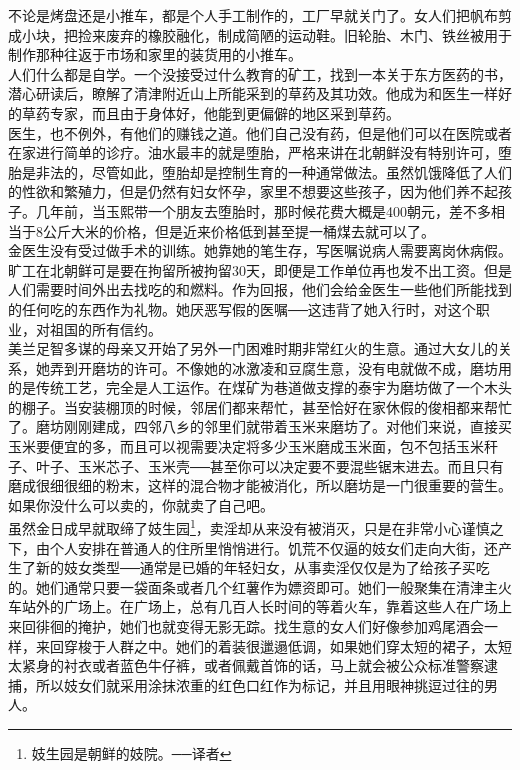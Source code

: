 不论是烤盘还是小推车，都是个人手工制作的，工厂早就关门了。女人们把帆布剪成小块，把捡来废弃的橡胶融化，制成简陋的运动鞋。旧轮胎、木门、铁丝被用于制作那种往返于市场和家里的装货用的小推车。\\

人们什么都是自学。一个没接受过什么教育的矿工，找到一本关于东方医药的书，潜心研读后，瞭解了清津附近山上所能采到的草药及其功效。他成为和医生一样好的草药专家，而且由于身体好，他能到更偏僻的地区采到草药。\\

医生，也不例外，有他们的赚钱之道。他们自己没有药，但是他们可以在医院或者在家进行简单的诊疗。油水最丰的就是堕胎，严格来讲在北朝鲜没有特别许可，堕胎是非法的，尽管如此，堕胎却是控制生育的一种通常做法。虽然饥饿降低了人们的性欲和繁殖力，但是仍然有妇女怀孕，家里不想要这些孩子，因为他们养不起孩子。几年前，当玉熙带一个朋友去堕胎时，那时候花费大概是400朝元，差不多相当于8公斤大米的价格，但是近来价格低到甚至提一桶煤去就可以了。\\

金医生没有受过做手术的训练。她靠她的笔生存，写医嘱说病人需要离岗休病假。旷工在北朝鲜可是要在拘留所被拘留30天，即便是工作单位再也发不出工资。但是人们需要时间外出去找吃的和燃料。作为回报，他们会给金医生一些他们所能找到的任何吃的东西作为礼物。她厌恶写假的医嘱──这违背了她入行时，对这个职业，对祖国的所有信约。\\

美兰足智多谋的母亲又开始了另外一门困难时期非常红火的生意。通过大女儿的关系，她弄到开磨坊的许可。不像她的冰激凌和豆腐生意，没有电就做不成，磨坊用的是传统工艺，完全是人工运作。在煤矿为巷道做支撑的泰宇为磨坊做了一个木头的棚子。当安装棚顶的时候，邻居们都来帮忙，甚至恰好在家休假的俊相都来帮忙了。磨坊刚刚建成，四邻八乡的邻里们就带着玉米来磨坊了。对他们来说，直接买玉米要便宜的多，而且可以视需要决定将多少玉米磨成玉米面，包不包括玉米秆子、叶子、玉米芯子、玉米壳──甚至你可以决定要不要混些锯末进去。而且只有磨成很细很细的粉末，这样的混合物才能被消化，所以磨坊是一门很重要的营生。\\

如果你没什么可以卖的，你就卖了自己吧。\\

虽然金日成早就取缔了妓生园\footnote{妓生园是朝鲜的妓院。──译者}，卖淫却从来没有被消灭，只是在非常小心谨慎之下，由个人安排在普通人的住所里悄悄进行。饥荒不仅逼的妓女们走向大街，还产生了新的妓女类型──通常是已婚的年轻妇女，从事卖淫仅仅是为了给孩子买吃的。她们通常只要一袋面条或者几个红薯作为嫖资即可。她们一般聚集在清津主火车站外的广场上。在广场上，总有几百人长时间的等着火车，靠着这些人在广场上来回徘徊的掩护，她们也就变得无影无踪。找生意的女人们好像参加鸡尾酒会一样，来回穿梭于人群之中。她们的着装很邋遢低调，如果她们穿太短的裙子，太短太紧身的衬衣或者蓝色牛仔裤，或者佩戴首饰的话，马上就会被公众标准警察逮捕，所以妓女们就采用涂抹浓重的红色口红作为标记，并且用眼神挑逗过往的男人。\\

